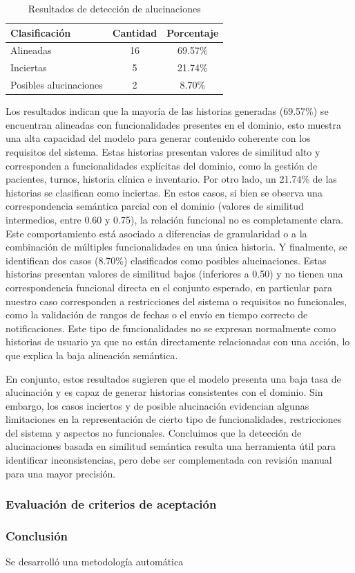\begin{table}[H]
\centering
\begin{tabular}{lcc}
\hline
\textbf{Clasificación} & \textbf{Cantidad} & \textbf{Porcentaje} \\
\hline
Alineadas & 16 & 69.57\% \\
Inciertas & 5 & 21.74\% \\
Posibles alucinaciones & 2 & 8.70\% \\
\hline
\end{tabular}
\caption{Resultados de detección de alucinaciones}
\label{tab:hallucinations}
\end{table}

Los resultados indican que la mayoría de las historias generadas (69.57\%) se encuentran alineadas con funcionalidades presentes en el dominio, esto muestra una alta capacidad del modelo para generar contenido coherente con los requisitos del sistema. Estas historias presentan valores de similitud alto y corresponden a funcionalidades explícitas del dominio, como la gestión de pacientes, turnos, historia clínica e inventario. Por otro lado, un 21.74\% de las historias se clasifican como inciertas. En estos casos, si bien se observa una correspondencia semántica parcial con el dominio (valores de similitud intermedios, entre 0.60 y 0.75), la relación funcional no es completamente clara. Este comportamiento está asociado a diferencias de granularidad o a la combinación de múltiples funcionalidades en una única historia. Y finalmente, se identifican dos casos (8.70\%) clasificados como posibles alucinaciones. Estas historias presentan valores de similitud bajos (inferiores a 0.50) y no tienen una correspondencia funcional directa en el conjunto esperado, en particular para nuestro caso corresponden a restricciones del sistema o requisitos no funcionales, como la validación de rangos de fechas o el envío en tiempo correcto de notificaciones. Este tipo de funcionalidades no se expresan normalmente como historias de usuario ya que no están directamente relacionadas con una acción, lo que explica la baja alineación semántica.

En conjunto, estos resultados sugieren que el modelo presenta una baja tasa de alucinación y es capaz de generar historias consistentes con el dominio. Sin embargo, los casos inciertos y de posible alucinación evidencian algunas limitaciones en la representación de cierto tipo de funcionalidades, restricciones del sistema y aspectos no funcionales. Concluimos que la detección de alucinaciones basada en similitud semántica resulta una herramienta útil para identificar inconsistencias, pero debe ser complementada con revisión manual para una mayor precisión.

\subsubsection{Evaluación de criterios de aceptación}

\subsubsection{Conclusión}
Se desarrolló una metodología automática 
